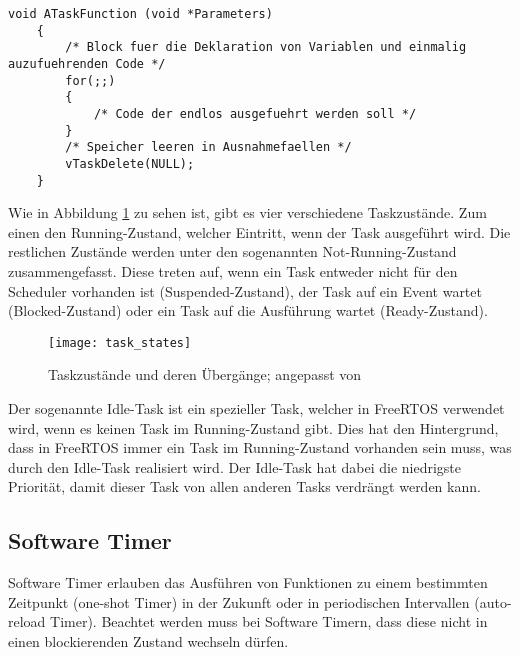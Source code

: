 \begin{lstlisting}[caption={[Minimaler Aufbau eines Tasks]Minimaler Aufbau eines Tasks; angepasst von \cite[S.~47]{barryFreeRTOS}}, label={lst:minimalTask}, style=generalStyle]
    void ATaskFunction (void *Parameters)
    {
        /* Block fuer die Deklaration von Variablen und einmalig auzufuehrenden Code */
        for(;;)
        {
            /* Code der endlos ausgefuehrt werden soll */
        }
        /* Speicher leeren in Ausnahmefaellen */
        vTaskDelete(NULL);
    }
\end{lstlisting}

Wie in Abbildung \ref{fig:taskStates} zu sehen ist, gibt es vier verschiedene Taskzustände. Zum einen den Running-Zustand, welcher Eintritt, wenn der Task ausgeführt wird. Die restlichen Zustände werden unter den sogenannten Not-Running-Zustand zusammengefasst. Diese treten auf, wenn ein Task entweder nicht für den Scheduler vorhanden ist (Suspended-Zustand), der Task auf ein Event wartet (Blocked-Zustand) oder ein Task auf die Ausführung wartet (Ready-Zustand). \cites[S.~55]{barryFreeRTOS}[S.~65f.]{barryFreeRTOS}

\begin{figure}[h]
    \centering
    \texttt{[image: task\_states]}
    \caption{Taskzustände und deren Übergänge; angepasst von \cite[S.~67]{barryFreeRTOS}}
    \label{fig:taskStates}
\end{figure}

Der sogenannte Idle-Task ist ein spezieller Task, welcher in FreeRTOS verwendet wird, wenn es keinen Task im Running-Zustand gibt. Dies hat den Hintergrund, dass in FreeRTOS immer ein Task im Running-Zustand vorhanden sein muss, was durch den Idle-Task realisiert wird. Der Idle-Task hat dabei die niedrigste Priorität, damit dieser Task von allen anderen Tasks verdrängt werden kann. \cite[S.~76]{barryFreeRTOS}

\subsection{Software Timer}
Software Timer erlauben das Ausführen von Funktionen zu einem bestimmten Zeitpunkt (one-shot Timer) in der Zukunft oder in periodischen Intervallen (auto-reload Timer). Beachtet werden muss bei Software Timern, dass diese nicht in einen blockierenden Zustand wechseln dürfen. \cites[S.~149]{barryFreeRTOS}[S.~151]{barryFreeRTOS}{freeRTOSTimer}

